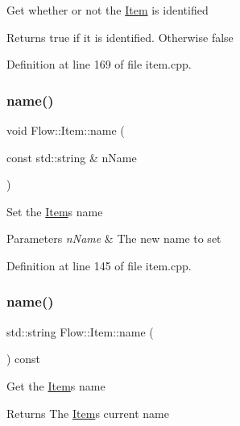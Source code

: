 Get whether or not the \hyperlink{class_flow_1_1_item}{Item} is identified \begin{DoxyReturn}{Returns}
true if it is identified. Otherwise false 
\end{DoxyReturn}


Definition at line 169 of file item.\+cpp.

\hypertarget{class_flow_1_1_item_a1e8fe7af2c547994e93bf1cbc3289908}{}\label{class_flow_1_1_item_a1e8fe7af2c547994e93bf1cbc3289908} 
\subsubsection{\texorpdfstring{name()}{name()}\hspace{0.1cm}{\footnotesize\ttfamily [1/2]}}
{\footnotesize\ttfamily void Flow\+::\+Item\+::name (\begin{DoxyParamCaption}\item[{const std\+::string \&}]{n\+Name }\end{DoxyParamCaption})}

Set the \hyperlink{class_flow_1_1_item}{Item}\textquotesingle{}s name 
\begin{DoxyParams}{Parameters}
{\em n\+Name} & The new name to set \\
\hline
\end{DoxyParams}


Definition at line 145 of file item.\+cpp.

\hypertarget{class_flow_1_1_item_a176977d10b96c739e28870bd928e34f8}{}\label{class_flow_1_1_item_a176977d10b96c739e28870bd928e34f8} 
\subsubsection{\texorpdfstring{name()}{name()}\hspace{0.1cm}{\footnotesize\ttfamily [2/2]}}
{\footnotesize\ttfamily std\+::string Flow\+::\+Item\+::name (\begin{DoxyParamCaption}{ }\end{DoxyParamCaption}) const}

Get the \hyperlink{class_flow_1_1_item}{Item}\textquotesingle{}s name \begin{DoxyReturn}{Returns}
The \hyperlink{class_flow_1_1_item}{Item}\textquotesingle{}s current name 
\end{DoxyReturn}


